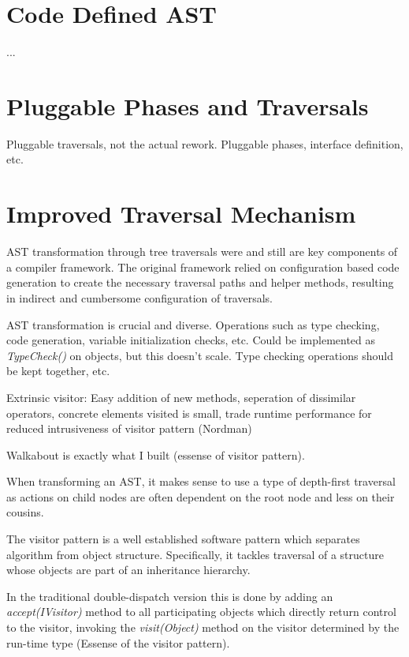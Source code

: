 \documentclass[twoside,openright]{uva-bachelor-thesis}
\begin{document}
	\section{Code Defined AST}
		...
		
	\section{Pluggable Phases and Traversals}
		Pluggable traversals, not the actual rework. Pluggable phases, interface definition, etc.
	
	\section{Improved Traversal Mechanism}
		AST transformation through tree traversals were and still are key components of a compiler framework. The original framework relied on configuration based code generation to create the necessary traversal paths and helper methods, resulting in indirect and cumbersome configuration of traversals. 
		
		AST transformation is crucial and diverse. Operations such as type checking, code generation, variable initialization checks, etc. Could be implemented as \textit{TypeCheck()} on objects, but this doesn't scale. Type checking operations should be kept together, etc.
		
		Extrinsic visitor: Easy addition of new methods, seperation of dissimilar operators, concrete elements visited is small, trade runtime performance for reduced intrusiveness of visitor pattern (Nordman)
		
		Walkabout is exactly what I built (essense of visitor pattern).
		
		When transforming an AST, it makes sense to use a type of depth-first traversal as actions on child nodes are often dependent on the root node and less on their cousins.
		
		The visitor pattern is a well established software pattern which separates algorithm from object structure. Specifically, it tackles traversal of a structure whose objects are part of an inheritance hierarchy.
		
		In the traditional double-dispatch version this is done by adding an \textit{accept(IVisitor)} method to all participating objects which directly return control to the visitor, invoking the \textit{visit(Object)} method on the visitor determined by the run-time type (Essense of the visitor pattern).
		
\end{document}
